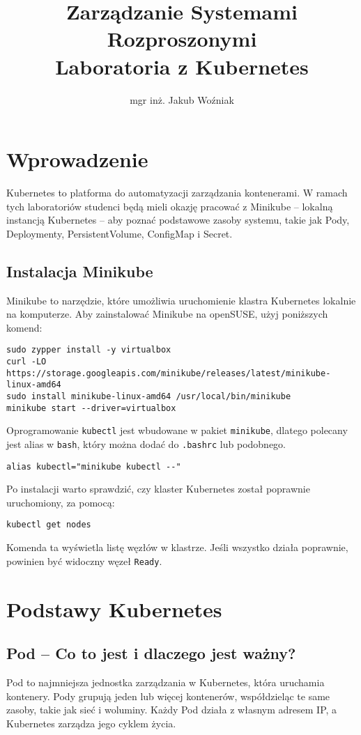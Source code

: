 \documentclass{article}
\title{Zarządzanie Systemami Rozproszonymi\\Laboratoria z Kubernetes}
\author{mgr inż. Jakub Woźniak}
\date{}
\begin{document}
\maketitle

\section{Wprowadzenie}
Kubernetes to platforma do automatyzacji zarządzania kontenerami. W ramach tych laboratoriów studenci będą mieli okazję pracować z Minikube – lokalną instancją Kubernetes – aby poznać podstawowe zasoby systemu, takie jak Pody, Deploymenty, PersistentVolume, ConfigMap i Secret.

\subsection{Instalacja Minikube}
Minikube to narzędzie, które umożliwia uruchomienie klastra Kubernetes lokalnie na komputerze. Aby zainstalować Minikube na openSUSE, użyj poniższych komend:
\begin{lstlisting}
sudo zypper install -y virtualbox
curl -LO https://storage.googleapis.com/minikube/releases/latest/minikube-linux-amd64
sudo install minikube-linux-amd64 /usr/local/bin/minikube
minikube start --driver=virtualbox
\end{lstlisting}
Oprogramowanie \texttt{kubectl} jest wbudowane w pakiet \texttt{minikube}, dlatego polecany jest alias w \texttt{bash}, który można dodać do \texttt{.bashrc} lub podobnego.
\begin{lstlisting}
alias kubectl="minikube kubectl --"
\end{lstlisting}

Po instalacji warto sprawdzić, czy klaster Kubernetes został poprawnie uruchomiony, za pomocą:
\begin{lstlisting}
kubectl get nodes
\end{lstlisting}
Komenda ta wyświetla listę węzłów w klastrze. Jeśli wszystko działa poprawnie, powinien być widoczny węzeł \texttt{Ready}.

\section{Podstawy Kubernetes}

\subsection{Pod – Co to jest i dlaczego jest ważny?}
Pod to najmniejsza jednostka zarządzania w Kubernetes, która uruchamia kontenery. Pody grupują jeden lub więcej kontenerów, współdzieląc te same zasoby, takie jak sieć i woluminy. Każdy Pod działa z własnym adresem IP, a Kubernetes zarządza jego cyklem życia.
\end{document}
